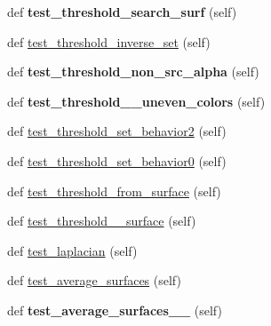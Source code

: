 \begin{DoxyCompactItemize}
def {\bfseries test\+\_\+threshold\+\_\+search\+\_\+surf} (self)
\item 
def \hyperlink{classpygame_1_1tests_1_1transform__test_1_1_transform_module_test_af3dd3027625c5273eb8a5fbf5a9579d0}{test\+\_\+threshold\+\_\+inverse\+\_\+set} (self)
\item 
\mbox{\label{classpygame_1_1tests_1_1transform__test_1_1_transform_module_test_af0f528a56742696da0e494991e76c4a1}} 
def {\bfseries test\+\_\+threshold\+\_\+non\+\_\+src\+\_\+alpha} (self)
\item 
\mbox{\label{classpygame_1_1tests_1_1transform__test_1_1_transform_module_test_a5340935f654b6e8b44c4251ba2ab24e1}} 
def {\bfseries test\+\_\+threshold\+\_\+\+\_\+uneven\+\_\+colors} (self)
\item 
def \hyperlink{classpygame_1_1tests_1_1transform__test_1_1_transform_module_test_a71ef5f0fb5ead9187ed56eeaae8ff61b}{test\+\_\+threshold\+\_\+set\+\_\+behavior2} (self)
\item 
def \hyperlink{classpygame_1_1tests_1_1transform__test_1_1_transform_module_test_a575974378a9a73f7092c9c3abe87b4b4}{test\+\_\+threshold\+\_\+set\+\_\+behavior0} (self)
\item 
def \hyperlink{classpygame_1_1tests_1_1transform__test_1_1_transform_module_test_a37552ca0932b6a016ea490f5710ea15c}{test\+\_\+threshold\+\_\+from\+\_\+surface} (self)
\item 
def \hyperlink{classpygame_1_1tests_1_1transform__test_1_1_transform_module_test_ab922b28b2c69f82f68e88ba6f2687f92}{test\+\_\+threshold\+\_\+\+\_\+surface} (self)
\item 
def \hyperlink{classpygame_1_1tests_1_1transform__test_1_1_transform_module_test_a76de5938447268e751470e667662a745}{test\+\_\+laplacian} (self)
\item 
def \hyperlink{classpygame_1_1tests_1_1transform__test_1_1_transform_module_test_a730f903b86088e8d881e80fedb08bbde}{test\+\_\+average\+\_\+surfaces} (self)
\item 
\mbox{\label{classpygame_1_1tests_1_1transform__test_1_1_transform_module_test_a3727f80d19f3e5c0e727514e06a8b2ab}} 
def {\bfseries test\+\_\+average\+\_\+surfaces\+\_\+\+\_} (self)
\item 

\end{DoxyCompactItemize}
